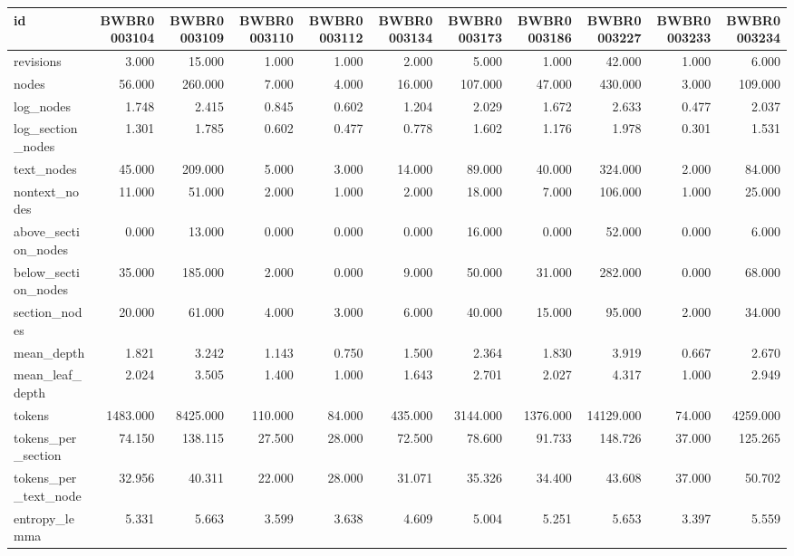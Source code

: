 \begin{tabular}{lrrrrrrrrrr}
\toprule
id & BWBR0003104 & BWBR0003109 & BWBR0003110 & BWBR0003112 & BWBR0003134 & BWBR0003173 & BWBR0003186 & BWBR0003227 & BWBR0003233 & BWBR0003234 \\
\midrule
revisions & 3.000 & 15.000 & 1.000 & 1.000 & 2.000 & 5.000 & 1.000 & 42.000 & 1.000 & 6.000 \\
\cline{1-11}
nodes & 56.000 & 260.000 & 7.000 & 4.000 & 16.000 & 107.000 & 47.000 & 430.000 & 3.000 & 109.000 \\
\cline{1-11}
log\_nodes & 1.748 & 2.415 & 0.845 & 0.602 & 1.204 & 2.029 & 1.672 & 2.633 & 0.477 & 2.037 \\
\cline{1-11}
log\_section\_nodes & 1.301 & 1.785 & 0.602 & 0.477 & 0.778 & 1.602 & 1.176 & 1.978 & 0.301 & 1.531 \\
\cline{1-11}
text\_nodes & 45.000 & 209.000 & 5.000 & 3.000 & 14.000 & 89.000 & 40.000 & 324.000 & 2.000 & 84.000 \\
\cline{1-11}
nontext\_nodes & 11.000 & 51.000 & 2.000 & 1.000 & 2.000 & 18.000 & 7.000 & 106.000 & 1.000 & 25.000 \\
\cline{1-11}
above\_section\_nodes & 0.000 & 13.000 & 0.000 & 0.000 & 0.000 & 16.000 & 0.000 & 52.000 & 0.000 & 6.000 \\
\cline{1-11}
below\_section\_nodes & 35.000 & 185.000 & 2.000 & 0.000 & 9.000 & 50.000 & 31.000 & 282.000 & 0.000 & 68.000 \\
\cline{1-11}
section\_nodes & 20.000 & 61.000 & 4.000 & 3.000 & 6.000 & 40.000 & 15.000 & 95.000 & 2.000 & 34.000 \\
\cline{1-11}
mean\_depth & 1.821 & 3.242 & 1.143 & 0.750 & 1.500 & 2.364 & 1.830 & 3.919 & 0.667 & 2.670 \\
\cline{1-11}
mean\_leaf\_depth & 2.024 & 3.505 & 1.400 & 1.000 & 1.643 & 2.701 & 2.027 & 4.317 & 1.000 & 2.949 \\
\cline{1-11}
tokens & 1483.000 & 8425.000 & 110.000 & 84.000 & 435.000 & 3144.000 & 1376.000 & 14129.000 & 74.000 & 4259.000 \\
\cline{1-11}
tokens\_per\_section & 74.150 & 138.115 & 27.500 & 28.000 & 72.500 & 78.600 & 91.733 & 148.726 & 37.000 & 125.265 \\
\cline{1-11}
tokens\_per\_text\_node & 32.956 & 40.311 & 22.000 & 28.000 & 31.071 & 35.326 & 34.400 & 43.608 & 37.000 & 50.702 \\
\cline{1-11}
entropy\_lemma & 5.331 & 5.663 & 3.599 & 3.638 & 4.609 & 5.004 & 5.251 & 5.653 & 3.397 & 5.559 \\

\end{tabular}
